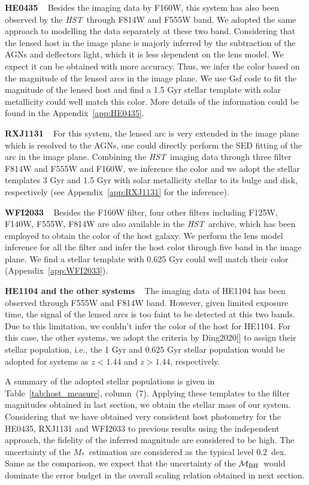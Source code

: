 \documentclass[fleqn,usenatbib]{mnras}
\newcommand{\hst}{{\it HST}}
\newcommand{\mbh}{$\mathcal M_{\rm BH}$}
\newcommand{\mstar}{{$M_*$}}
\begin{document}
{\bf HE0435} ~ Besides the imaging data by F160W, this system has also been observed by the \hst\ through F814W and F555W band. We adopted the same approach to modelling the data separately at these two band. %
Considering that the lensed host in the image plane is majorly inferred by the subtraction of the AGNs and deflectors light, which it is less dependent on the lens model. We expect it can be obtained with more accuracy. Thus, we infer the color based on the magnitude of the lensed arcs in the image plane. We use {\sc Gsf} code to fit the magnitude of the lensed host and find a 1.5 Gyr stellar template with solar metallicity could well match this color. More details of the information could be found in the Appendix~\ref{app:HE0435}.

{\bf RXJ1131} ~ For this system, the lensed arc is very extended in the image plane which is resolved to the AGNs, one could directly perform the SED fitting of the arc in the image plane. Combining the \hst\ imaging data through three filter F814W and F555W and F160W, we inference the color and we adopt the stellar templates 3 Gyr and 1.5 Gyr with solar metallicity stellar to its bulge and disk, respectively (see Appendix~\ref{app:RXJ1131} for the inference).

{\bf WFI2033} ~ Besides the F160W filter, four other filters including F125W, F140W, F555W, F814W are also available in the \hst\ archive, which has been employed to obtain the color of the host galaxy. We perform the lens model inference for all the filter and infer the host color through five band in the image plane. We find a stellar template with 0.625 Gyr could well match their color (Appendix~\ref{app:WFI2033}).

{\bf HE1104 and the other systems} ~ The imaging data of HE1104 has been observed through F555W and F814W band. However, given limited exposure time, the signal of the lensed arcs is too faint to be detected at this two bands. Due to this limitation, we couldn't infer the color of the host for HE1104. For this case, the other systems, we adopt the criteria by Ding2020[] to assign their stellar population, i.e., the 1 Gyr and 0.625 Gyr stellar population would be adopted for systems as $z<1.44$ and $z>1.44$, respectively.

A summary of the adopted stellar populations is given in Table~\ref{tab:host_measure}, column~(7). Applying these templates to the filter magnitudes obtained in last section, we obtain the stellar mass of our system. Considering that we have obtained very consistent host photometry for the HE0435, RXJ1131 and WFI2033 to previous results using the independent approach, the fidelity of the inferred magnitude are considered to be high. The uncertainty of the \mstar\ estimation are considered as the typical level $0.2$~dex. Same as the comparison, we expect that the uncertainty of the \mbh\ would dominate the error budget in the overall scaling relation obtained in next section.
\end{document}
